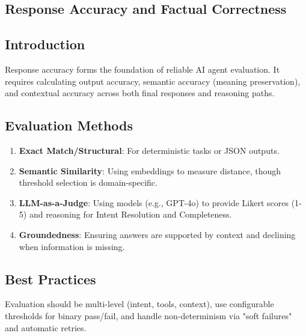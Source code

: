 \begin{TNtwocol}
\section{Response Accuracy and Factual Correctness }
\subsection{Introduction}
Response accuracy forms the foundation of reliable AI agent evaluation. It requires calculating output accuracy, semantic accuracy (meaning preservation), and contextual accuracy across both final responses and reasoning paths.

\subsection{Evaluation Methods}
\begin{enumerate}
    \item \textbf{Exact Match/Structural}: For deterministic tasks or JSON outputs.
    \item \textbf{Semantic Similarity}: Using embeddings to measure distance, though threshold selection is domain-specific.
    \item \textbf{LLM-as-a-Judge}: Using models (e.g., GPT-4o) to provide Likert scores (1-5) and reasoning for Intent Resolution and Completeness.
    \item \textbf{Groundedness}: Ensuring answers are supported by context and declining when information is missing.
\end{enumerate}

\subsection{Best Practices}
Evaluation should be multi-level (intent, tools, context), use configurable thresholds for binary pass/fail, and handle non-determinism via "soft failures" and automatic retries.
\end{TNtwocol}
